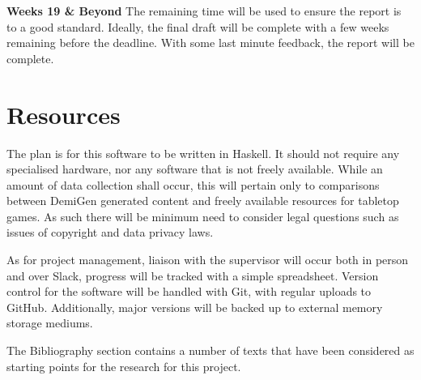 \documentclass{article}
\begin{document}
\large
\textbf{Weeks 19 \& Beyond}
The remaining time will be used to ensure the report is to a good standard. Ideally, the final draft will be complete with a few weeks remaining before the deadline. With some last minute feedback, the report will be complete.

\section{Resources}
The plan is for this software to be written in Haskell. It should not require any specialised hardware, nor any software that is not freely available. While an amount of data collection shall occur, this will pertain only to comparisons between DemiGen generated content and freely available resources for tabletop games. As such there will be minimum need to consider legal questions such as issues of copyright and data privacy laws.

As for project management, liaison with the supervisor will occur both in person and over Slack, progress will be tracked with a simple spreadsheet.
Version control for the software will be handled with Git, with regular uploads to GitHub. Additionally, major versions will be backed up to external memory storage mediums. 

The Bibliography section contains a number of texts that have been considered as starting points for the research for this project.




\end{document}
